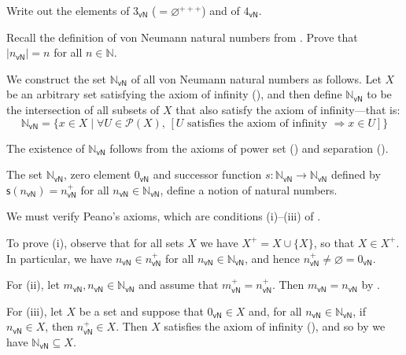\begin{exercise}
Write out the elements of $3_{\mathsf{vN}}$ ($=\varnothing^{+++}$) and of $4_{\mathsf{vN}}$.
\end{exercise}

\begin{exercise}
\label{exSizeOfVonNeumannOrdinals}
Recall the definition of von Neumann natural numbers from . Prove that $|n_{\mathsf{vN}}| = n$ for all $n \in \mathbb{N}$.
\end{exercise}

\begin{construction}
\label{cnsNaturalNumbersVonNeumann}
We construct the set $\mathbb{N}_{\mathsf{vN}}$ of all von Neumann natural numbers as follows. Let $X$ be an arbitrary set satisfying the axiom of infinity (), and then define $\mathbb{N}_{\mathsf{vN}}$ to be the intersection of all subsets of $X$ that also satisfy the axiom of infinity---that is:
\[ \mathbb{N}_{\mathsf{vN}} = \{ x \in X \mid \forall U \in \mathcal{P}(X),\, [U \text{ satisfies the axiom of infinity } \Rightarrow x \in U ] \} \]
\end{construction}

The existence of $\mathbb{N}_{\mathsf{vN}}$ follows from the axioms of power set () and separation ().

\begin{theorem}
\label{thmVonNeumannNaturalNumbers}
The set $\mathbb{N}_{\mathsf{vN}}$, zero element $0_{\mathsf{vN}}$ and successor function $s : \mathbb{N}_{\mathsf{vN}} \to \mathbb{N}_{\mathsf{vN}}$ defined by $\mathsf{s}(n_{\mathsf{vN}}) = n_{\mathsf{vN}}^+$ for all $n_{\mathsf{vN}} \in \mathbb{N}_{\mathsf{vN}}$, define a notion of natural numbers.
\end{theorem}

\begin{cproof}
We must verify Peano's axioms, which are conditions (i)--(iii) of .

To prove (i), observe that for all sets $X$ we have $X^+ = X \cup \{ X \}$, so that $X \in X^+$. In particular, we have $n_{\mathsf{vN}} \in n_{\mathsf{vN}}^+$ for all $n_{\mathsf{vN}} \in \mathbb{N}_{\mathsf{vN}}$, and hence $n_{\mathsf{vN}}^+ \ne \varnothing = 0_{\mathsf{vN}}$.

For (ii), let $m_{\mathsf{vN}}, n_{\mathsf{vN}} \in \mathbb{N}_{\mathsf{vN}}$ and assume that $m_{\mathsf{vN}}^+ = n_{\mathsf{vN}}^+$. Then $m_{\mathsf{vN}} = n_{\mathsf{vN}}$ by .

For (iii), let $X$ be a set and suppose that $0_{\mathsf{vN}} \in X$ and, for all $n_{\mathsf{vN}} \in \mathbb{N}_{\mathsf{vN}}$, if $n_{\mathsf{vN}} \in X$, then $n_{\mathsf{vN}}^+ \in X$. Then $X$ satisfies the axiom of infinity (), and so by  we have $\mathbb{N}_{\mathsf{vN}} \subseteq X$.
\end{cproof}


